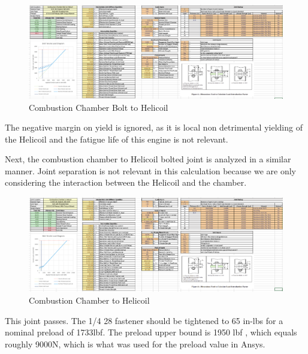  \begin{figure}
     \centering
     \includegraphics[width=1\linewidth]{Combustion Chamber Bolt to Helicoil.png}
     \caption{Combustion Chamber Bolt to Helicoil}
     \label{fig:Combustion Chamber Bolt to Helicoil}
 \end{figure}
The negative margin on yield is ignored, as it is local non detrimental yielding of the Helicoil and the fatigue life of this engine is not relevant. 

Next, the combustion chamber to Helicoil bolted joint is analyzed in a similar manner. Joint separation is not relevant in this calculation because we are only considering the interaction between the Helicoil and the chamber. 

 \begin{figure}
     \centering
     \includegraphics[width=1\linewidth]{Images/Combustion Chamber to Helicoil.png}
     \caption{Combustion Chamber to Helicoil}
     \label{fig:Combustion Chamber to Helicoil}
 \end{figure}
This joint passes. The 1/4 28 fastener should be tightened to 65 in-lbs for a nominal preload of 1733lbf. The preload upper bound is 1950 lbf , which equals roughly 9000N, which is what was used for the preload value in Ansys. 

 


